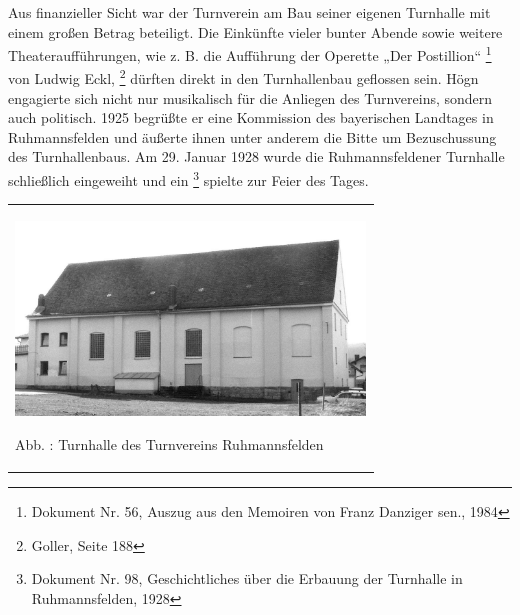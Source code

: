 Aus finanzieller Sicht war der Turnverein am Bau seiner eigenen
Turnhalle mit einem großen Betrag beteiligt. Die Einkünfte vieler
bunter Abende sowie weitere Theateraufführungen, wie z. B. die
Aufführung der Operette „Der Postillion“  \footnote{Dokument Nr. 56,
Auszug aus den Memoiren von Franz Danziger sen., 1984} von Ludwig
Eckl, \footnote{Goller, Seite 188} dürften direkt in den Turnhallenbau
geflossen sein. Högn engagierte sich nicht nur musikalisch für die
Anliegen des Turnvereins, sondern auch politisch. 1925 begrüßte er eine
Kommission des bayerischen Landtages in Ruhmannsfelden und äußerte
ihnen unter anderem die Bitte um Bezuschussung des Turnhallenbaus. Am
29. Januar 1928 wurde die Ruhmannsfeldener Turnhalle schließlich
eingeweiht und ein  \footnote{Dokument Nr. 98, Geschichtliches
über die Erbauung der Turnhalle in Ruhmannsfelden, 1928} spielte zur
Feier des Tages.

\begin{center}
\begin{minipage}{9.684cm}
\begin{flushleft}
\tablefirsthead{}
\tablehead{}
\tabletail{}
\tablelasttail{}
\begin{supertabular}{m{9.484cm}}

\includegraphics[width=9.303cm,height=5.168cm]{pictures/zulassungsarbeit-img023.jpg}

Abb. : Turnhalle des Turnvereins
Ruhmannsfelden\\
\end{supertabular}
\end{flushleft}
\end{minipage}
\end{center}
